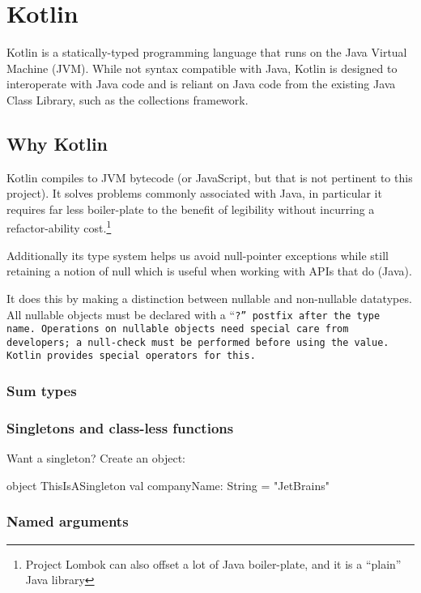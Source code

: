 \section{Kotlin}

Kotlin is a statically-typed programming language that runs on the
Java Virtual Machine (JVM). While not syntax compatible with Java,
Kotlin is designed to interoperate with Java code and is reliant on
Java code from the existing Java Class Library, such as the
collections framework.

\subsection{Why Kotlin}

Kotlin compiles to JVM bytecode (or JavaScript, but that is not
pertinent to this project). It solves problems commonly associated
with Java, in particular it requires far less boiler-plate to the
benefit of legibility without incurring a refactor-ability
cost.\footnote{Project Lombok can also offset a lot of Java
  boiler-plate, and it is a ``plain'' Java library}

Additionally its type system helps us avoid null-pointer exceptions
while still retaining a notion of null which is useful when working
with APIs that do (Java).

It does this by making a distinction between nullable and non-nullable
datatypes. All nullable objects must be declared with a ``\tt{?}''
postfix after the type name. Operations on nullable objects need
special care from developers; a null-check must be performed before
using the value. Kotlin provides special operators for this.

\subsubsection{Sum types}


\subsubsection{Singletons and class-less functions}

Want a singleton? Create an object:

object ThisIsASingleton {
    val companyName: String = "JetBrains"
  }

  \subsubsection{Named arguments}

